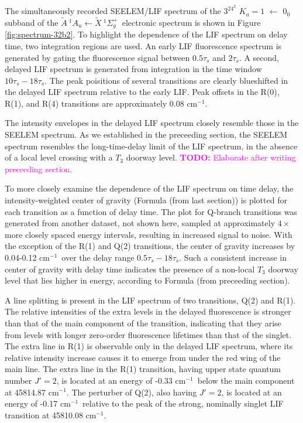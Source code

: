 \documentclass[12pt]{mitthesis}
\newcommand{\TODO} [1]{\textcolor{magenta}{\textbf{TODO:} #1}}
\newcommand{\rcm}{cm$^{-1}$}
\newcommand{\AtoX}{$
  \tilde{A} \: ^1\!A_u 
  \leftarrow 
  \tilde{X} \: ^1\Sigma_g^+
  $}
\newcommand{\Ka}[1]{$K_a\!\!=\!#1$}
\begin{document}
The simultaneously recorded SEELEM/LIF spectrum of the $3^24^2$ \Ka{1}
$\leftarrow$ $0_0$ subband of the \AtoX\ electronic spectrum is shown
in Figure \ref{fig:spectrum-32b2}. To highlight the dependence of the
LIF spectrum on delay time, two integration regions are used.  An
early LIF fluorescence spectrum is generated by gating the
fluorescence signal between $0.5\tau_s$ and $2\tau_s$.  A second,
delayed LIF spectrum is generated from integration in the time window
$10\tau_s-18\tau_s$.  The peak poisitions of several transitions are
clearly blueshifted in the delayed LIF spectrum relative to the early
LIF.  Peak offsets in the R(0), R(1), and R(4) transitions are
approximately 0.08 \rcm.

The intensity envelopes in the delayed LIF spectrum closely resemble
those in the SEELEM spectrum.  As we established in the preceeding
section, the SEELEM spectrum resembles the long-time-delay limit of
the LIF spectrum, in the absence of a local level crossing with a
$T_3$ doorway level.  \TODO{Elaborate after writing preceeding
  section.}

To more closely examine the dependence of the LIF spectrum on time
delay, the intensity-weighted center of gravity (Formula (from last
section)) is plotted for each transition as a function of delay time.
The plot for Q-branch transitions was generated from another dataset,
not shown here, sampled at approximately $4 \times$ more closely
spaced energy intervals, resulting in increased signal to noise.  With
the exception of the R(1) and Q(2) transitions, the center of gravity
increases by 0.04-0.12 \rcm\ over the delay range
$0.5\tau_s-18\tau_s$.  Such a consistent increase in center of gravity
with delay time indicates the presence of a non-local $T_3$ doorway
level that lies higher in energy, according to Formula (from
preceeding section).


A line splitting is present in the LIF spectrum of two transitions,
Q(2) and R(1).  The relative intensities of the extra levels in the
delayed fluorescence is stronger than that of the main component of
the transition, indicating that they arise from levels with longer
zero-order fluorescence lifetimes than that of the singlet.  The extra
line in R(1) is observable only in the delayed LIF spectrum, where its
relative intensity increase causes it to emerge from under the red
wing of the main line.  The extra line in the R(1) transition, having
upper state quantum number $J'=2$, is located at an energy of -0.33
\rcm\ below the main component at 45814.87 \rcm.  The perturber of
Q(2), also having $J'=2$, is located at an energy of -0.17 \rcm\
relative to the peak of the strong, nominally singlet LIF transition
at 45810.08 \rcm.
\end{document}
